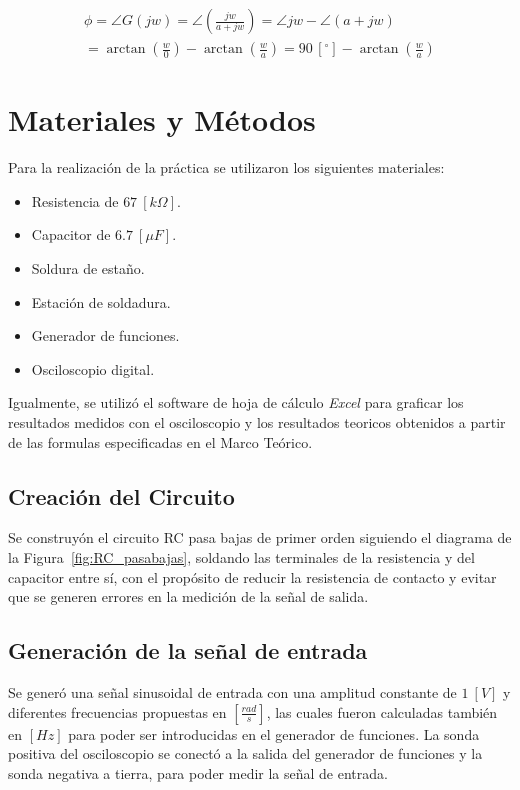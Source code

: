 \documentclass{article}
\begin{document}
\begin{equation}
    \begin{aligned}
         \phi = \angle G(jw) = \angle \left(\frac{jw}{a+jw}\right) = \angle jw-\angle (a+jw) \\ = \arctan\left(\frac{w}{0}\right) -\arctan\left(\frac{w}{a}\right)= 90\,[^\circ] - \arctan \left(\frac{w}{a}\right)
        \label{eq:fase_pa}
    \end{aligned}
\end{equation}



\section{Materiales y Métodos}
Para la realización de la práctica se utilizaron los siguientes materiales:
\begin{itemize}

	\item Resistencia de $67\ [k\Omega]$.
	\item Capacitor de $6.7\ [\mu F]$.
	\item Soldura de estaño.
	\item Estación de soldadura.
	\item Generador de funciones.
	\item Osciloscopio digital.
	
\end{itemize}

Igualmente, se utilizó el software de hoja de cálculo \textit{Excel} para graficar los resultados 
medidos con el osciloscopio y los resultados teoricos obtenidos a partir de las formulas especificadas 
en el Marco Teórico.

\subsection{Creación del Circuito}
Se construyón el circuito RC pasa bajas de primer orden siguiendo el diagrama de la 
Figura~\ref{fig:RC_pasabajas}, soldando las terminales de la resistencia y del capacitor
entre sí, con el propósito de reducir la resistencia de contacto y evitar que se generen
errores en la medición de la señal de salida.

\subsection{Generación de la señal de entrada}
Se generó una señal sinusoidal de entrada con una amplitud constante de $1\ [V]$
y diferentes frecuencias propuestas en $[\frac{rad}{s}]$, las cuales fueron calculadas
también en $[Hz]$ para poder ser introducidas en el generador de funciones. La sonda
positiva del osciloscopio se conectó a la salida del generador de funciones y la sonda
negativa a tierra, para poder medir la señal de entrada.
\end{document}

